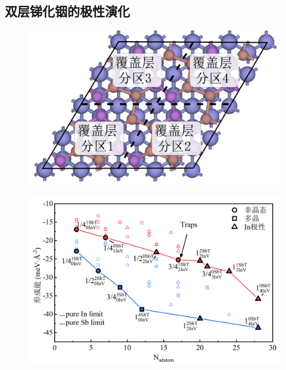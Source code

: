 \subsection{双层锑化铟的极性演化}
\begin{figure}
    \includegraphics{pic/IS_diagram_2Linsb_partial.png}
\end{figure}

\begin{figure}
    \includegraphics{pic/IS_DFT_2LInSb_partEnergy.png}
\end{figure}

